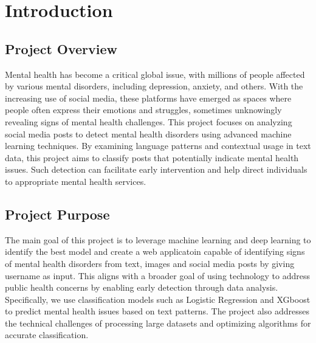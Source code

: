 
\section{Introduction}

\begin{comment}
    Briefly introduce the project's overall topic and purpose.
    \vspace{.1in}
    
    \noindent
    Provide specifications of Technical domain (Hardware, Operating System, Software) and Business domain.
    \vspace{.1in}
    
    \noindent
    Provide \textbf{Glossary} / Keywords in a tabular format.
\end{comment}


\subsection{Project Overview}
\vspace{.1in}
\noindent
Mental health has become a critical global issue, with millions of people affected by various mental disorders, including depression, anxiety, and others. With the increasing use of social media, these platforms have emerged as spaces where people often express their emotions and struggles, sometimes unknowingly revealing signs of mental health challenges. This project focuses on analyzing social media posts to detect mental health disorders using advanced machine learning techniques. By examining language patterns and contextual usage in text data, this project aims to classify posts that potentially indicate mental health issues. Such detection can facilitate early intervention and help direct individuals to appropriate mental health services.

\subsection{Project Purpose}
\vspace{.1in}
\noindent
The main goal of this project is to leverage machine learning and deep learning to identify the best model and create a web applicatoin capable of identifying signs of mental health disorders from text, images and social media posts by giving username as input. This aligns with a broader goal of using technology to address public health concerns by enabling early detection through data analysis. Specifically, we use classification models such as Logistic Regression and XGboost to predict mental health issues based on text patterns. The project also addresses the technical challenges of processing large datasets and optimizing algorithms for accurate classification.


